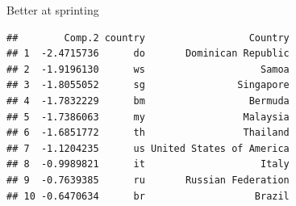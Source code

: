 \documentclass[ignorenonframetext,]{beamer}
\newenvironment{Shaded}{\begin{snugshade}}{\end{snugshade}}
\newcommand{\DataTypeTok}[1]{\textcolor[rgb]{0.13,0.29,0.53}{#1}}
\newcommand{\DecValTok}[1]{\textcolor[rgb]{0.00,0.00,0.81}{#1}}
\newcommand{\FloatTok}[1]{\textcolor[rgb]{0.00,0.00,0.81}{#1}}
\newcommand{\KeywordTok}[1]{\textcolor[rgb]{0.13,0.29,0.53}{\textbf{#1}}}
\newcommand{\NormalTok}[1]{#1}
\newcommand{\OperatorTok}[1]{\textcolor[rgb]{0.81,0.36,0.00}{\textbf{#1}}}
\newcommand{\StringTok}[1]{\textcolor[rgb]{0.31,0.60,0.02}{#1}}
\begin{document}
\begin{frame}[fragile]{Better at sprinting}
\protect\hypertarget{better-at-sprinting}{}

\footnotesize

\begin{Shaded}
\end{Shaded}

\begin{verbatim}
##        Comp.2 country                  Country
## 1  -2.4715736      do       Dominican Republic
## 2  -1.9196130      ws                    Samoa
## 3  -1.8055052      sg                Singapore
## 4  -1.7832229      bm                  Bermuda
## 5  -1.7386063      my                 Malaysia
## 6  -1.6851772      th                 Thailand
## 7  -1.1204235      us United States of America
## 8  -0.9989821      it                    Italy
## 9  -0.7639385      ru       Russian Federation
## 10 -0.6470634      br                   Brazil
\end{verbatim}

\normalsize

\end{frame}
\end{document}
